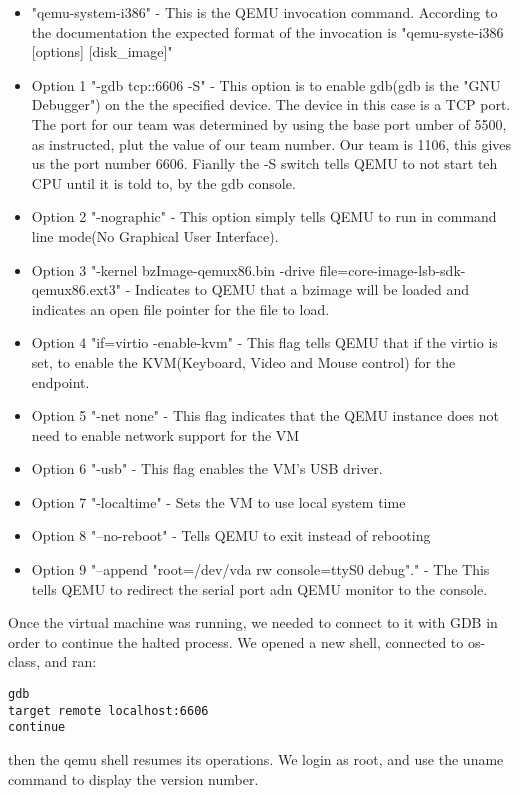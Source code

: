 \documentclass[letterpaper,10pt,draftclsnofoot,onecolumn]{IEEEtran}
\begin{document}
\begin{itemize}
\item "qemu-system-i386" - This is the QEMU invocation command. According to the documentation the expected format of the invocation is "qemu-syste-i386 [options] [disk\_image]" \cite{QEMUDOC1} 
\item Option 1 "-gdb tcp::6606 -S" - This option is to enable gdb(gdb is the "GNU Debugger") on the the specified device. The device in this case is a TCP port. The port for our team was determined by using the base port umber of 5500, as instructed, plut the value of our team number. Our team is 1106, this gives us the port number 6606. Fianlly the -S switch tells QEMU to not start teh CPU until it is told to, by the gdb console. \cite{QEMUDOC1}
\item Option 2 "-nographic" - This option simply tells QEMU to run in command line mode(No Graphical User Interface).\cite{QEMUDOC1}
\item Option 3 "-kernel bzImage-qemux86.bin -drive file=core-image-lsb-sdk-qemux86.ext3" - Indicates to QEMU that a bzimage will be loaded and indicates an open file pointer for the file to load. \cite{QEMUDOC1}
\item Option 4 "if=virtio -enable-kvm" - This flag tells QEMU that if the virtio is set, to enable the KVM(Keyboard, Video and Mouse control) for the endpoint. \cite{QEMUDOC1}
\item Option 5 "-net none" - This flag indicates that the QEMU instance does not need to enable network support for the VM\cite{QEMUDOC1}
\item Option 6 "-usb" - This flag enables the VM's USB driver.\cite{QEMUDOC1}
\item Option 7 "-localtime" - Sets the VM to use local system time\cite{QEMUDOC1}
\item Option 8 "--no-reboot" - Tells QEMU to exit instead of rebooting\cite{QEMUDOC1}
\item Option 9 "--append "root=/dev/vda rw console=ttyS0 debug"." - The This tells QEMU to redirect the serial port adn QEMU monitor to the console.\cite{QEMUDOC1}
\end{itemize}

Once the virtual machine was running, we needed to connect to it with GDB in order to continue the halted process. We opened a new shell, connected to os-class, and ran:
\begin{lstlisting}
gdb
target remote localhost:6606
continue
\end{lstlisting}

then the qemu shell resumes its operations. We login as root, and use the uname command to display the version number.




%
\end{document}
